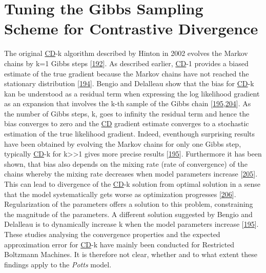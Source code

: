 \documentclass[11pt,a4paper,twoside]{book}
\theoremstyle{definition}
\theoremstyle{definition}
\theoremstyle{remark}
\begin{document}
\section{Tuning the Gibbs Sampling Scheme for Contrastive
Divergence}\label{cd-sampling-optimization}

The original \protect\hyperlink{abbrev}{CD}-k algorithm described by
Hinton in 2002 evolves the Markov chains by k=1 Gibbs steps
{[}\protect\hyperlink{ref-Hinton2002}{192}{]}. As described earlier,
\protect\hyperlink{abbrev}{CD}-1 provides a biased estimate of the true
gradient because the Markov chains have not reached the stationary
distribution {[}\protect\hyperlink{ref-Fischer2012}{194}{]}. Bengio and
Delalleau show that the bias for \protect\hyperlink{abbrev}{CD}-k kan be
understood as a residual term when expressing the log likelihood
gradient as an expansion that involves the k-th sample of the Gibbs
chain
{[}\protect\hyperlink{ref-Bengio2009}{195},\protect\hyperlink{ref-Ma2016}{204}{]}.
As the number of Gibbs steps, k, goes to infinity the residual term and
hence the bias converges to zero and the \protect\hyperlink{abbrev}{CD}
gradient estimate converges to a stochastic estimation of the true
likelihood gradient. Indeed, eventhough surprising results have been
obtained by evolving the Markov chains for only one Gibbs step,
typically \protect\hyperlink{abbrev}{CD}-k for
k\textgreater{}\textgreater{}1 gives more precise results
{[}\protect\hyperlink{ref-Bengio2009}{195}{]}. Furthermore it has been
shown, that bias also depends on the mixing rate (rate of convergence)
of the chains whereby the mixing rate decreases when model parameters
increase {[}\protect\hyperlink{ref-Tieleman2008}{205}{]}. This can lead
to divergence of the \protect\hyperlink{abbrev}{CD}-k solution from
optimal solution in a sense that the model systematically gets worse as
optimization progresses {[}\protect\hyperlink{ref-Fischer2010}{206}{]}.
Regularization of the parameters offers a solution to this problem,
constraining the magnitude of the parameters. A different solution
suggested by Bengio and Delalleau is to dynamically increase k when the
model parameters increase {[}\protect\hyperlink{ref-Bengio2009}{195}{]}.
These studies analysing the convergence properties and the expected
approximation error for \protect\hyperlink{abbrev}{CD}-k have mainly
been conducted for Restricted Boltzmann Machines. It is therefore not
clear, whether and to what extent these findings apply to the
\emph{Potts} model.
\end{document}
